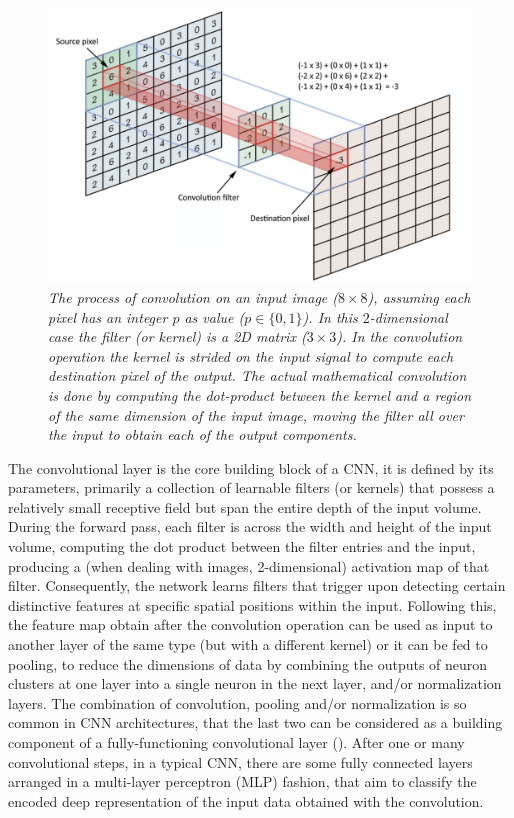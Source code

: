 \documentclass[binding=0.6cm]{sapthesis}
\newcommand{\mycite}[1]{(\cite{#1})}
\begin{document}
\begin{figure}
    \includegraphics[width=\textwidth]{imgs/background/convolution_op.png}
    \caption{\textit{The process of convolution on an input image ($8 \times 8$), assuming each pixel has an integer $p$ as value ($p \in \{0,1\}$). In this $2$-dimensional case the filter (or kernel) is a 2D matrix ($3\times3$). In the convolution operation the kernel is strided on the input signal to compute each destination pixel of the output. The actual mathematical convolution is done by computing the dot-product between the kernel and a region of the same dimension of the input image, moving the filter all over the input to obtain each of the output components.}}
    \label{fig:bg.convolution}
\end{figure}

The convolutional layer is the core building block of a CNN, it is defined by its parameters, primarily a collection of learnable filters (or kernels) that possess a relatively small receptive field but span the entire depth of the input volume. During the forward pass, each filter is  across the width and height of the input volume, computing the dot product between the filter entries and the input, producing a (when dealing with images, 2-dimensional) activation map of that filter. Consequently, the network learns filters that trigger upon detecting certain distinctive features at specific spatial positions within the input. Following this, the feature map obtain after the convolution operation can be used as input to another layer of the same type (but with a different kernel) or it can be fed to pooling, to reduce the dimensions of data by combining the outputs of neuron clusters at one layer into a single neuron in the next layer, and/or normalization layers. The combination of convolution, pooling and/or normalization is so common in CNN architectures, that the last two can be considered as a building component of a fully-functioning convolutional layer \mycite{LeCun2015DeepL}. After one or many convolutional steps, in a typical CNN, there are some fully connected layers arranged in a multi-layer perceptron (MLP) fashion, that aim to classify the encoded deep representation of the input data obtained with the convolution.
\end{document}
